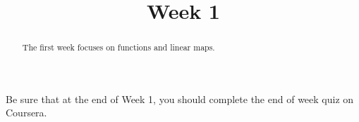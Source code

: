 \documentclass{ximera}
\title{Week 1}
\begin{document}
\begin{abstract}
  The first week focuses on functions and linear maps.
\end{abstract}

Be sure that at the end of Week 1, you should complete the end of week quiz on Coursera.
\end{document}
